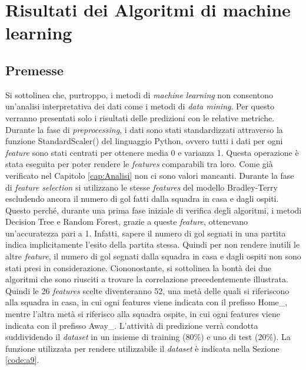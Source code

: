 \chapter{Risultati dei Algoritmi di machine learning}
\label{cap:RisML}

\section{Premesse}
Si sottolinea che, purtroppo, i metodi di \emph{machine learning} non consentono un'analisi interpretativa dei dati come i metodi di \emph{data mining}. Per questo verranno presentati solo i risultati delle predizioni con le relative metriche.\\
Durante la fase di \emph{preprocessing}, i dati sono stati standardizzati attraverso la funzione \textsf{StandardScaler()} del linguaggio Python, ovvero tutti i dati per ogni \emph{feature} sono stati centrati per ottenere media 0 e varianza 1. Questa operazione è stata eseguita per poter rendere le \emph{features} comparabili tra loro. Come già verificato nel Capitolo \ref{cap:Analisi} non ci sono valori mancanti. Durante la fase di \emph{feature selection} si utilizzano le stesse \emph{features} del modello Bradley-Terry escludendo ancora il numero di gol fatti dalla squadra in casa e dagli ospiti. Questo perché, durante una prima fase iniziale di verifica degli algoritmi, i metodi Decision Tree e Random Forest, grazie a queste \emph{feature}, ottenevano un’accuratezza pari a 1. Infatti, sapere il numero di gol segnati in una partita indica implicitamente l'esito della partita stessa. Quindi per non rendere inutili le altre \emph{feature}, il numero di gol segnati dalla squadra in casa e dagli ospiti non sono stati presi in considerazione. Ciononostante, si sottolinea la bontà dei due algoritmi che sono riusciti a trovare la correlazione precedentemente illustrata. Quindi le 26 \emph{features} scelte diventeranno 52, una metà delle quali si riferiscono alla squadra in casa, in cui ogni features viene indicata con il prefisso \textsf{Home\_}, mentre l'altra metà si riferisco alla squadra ospite, in cui ogni features viene indicata con il prefisso \textsf{Away\_}. L'attività di predizione verrà condotta suddividendo il \emph{dataset} in un insieme di training (80\%) e uno di test (20\%). La funzione utilizzata per rendere utilizzabile il \emph{dataset} è indicata nella Sezione \ref{code:a9}.

